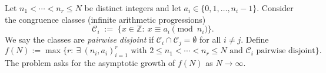 Let $n_1<\cdots<n_r\le N$ be distinct integers and let $a_i\in\{0,1,\dots,n_i-1\}$.
Consider the congruence classes (infinite arithmetic progressions)
\[
\mathcal{C}_i \;:=\; \{x\in\mathbb{Z}:\ x\equiv a_i\pmod{n_i}\}.
\]
We say the classes are \emph{pairwise disjoint} if $\mathcal{C}_i\cap\mathcal{C}_j=\emptyset$ for all $i\ne j$.
Define
\[
 f(N) := \max\bigl\{r:\ \exists\ (n_i,a_i)_{i=1}^r\text{ with }2\le n_1<\cdots<n_r\le N\text{ and }\mathcal{C}_i\text{ pairwise disjoint}\bigr\}.
\]
The problem asks for the asymptotic growth of $f(N)$ as $N\to\infty$.

